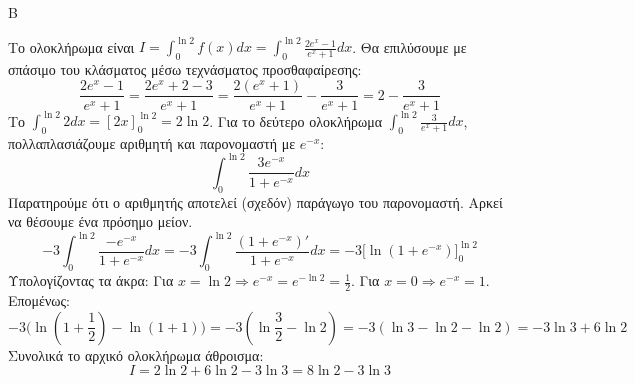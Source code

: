 \begin{thema}{Β}
\begin{erwthma}
\item Το ολοκλήρωμα είναι $I = \int_0^{\ln 2} f(x) dx = \int_0^{\ln 2} \frac{2e^x-1}{e^x+1} dx$.
Θα επιλύσουμε με σπάσιμο του κλάσματος μέσω τεχνάσματος προσθαφαίρεσης:
\[ \frac{2e^x-1}{e^x+1} = \frac{2e^x+2 - 3}{e^x+1} = \frac{2(e^x+1)}{e^x+1} - \frac{3}{e^x+1} = 2 - \frac{3}{e^x+1} \]
Το $\int_0^{\ln 2} 2 dx = [2x]_0^{\ln 2} = 2\ln 2$.
Για το δεύτερο ολοκλήρωμα $\int_0^{\ln 2} \frac{3}{e^x+1} dx$, πολλαπλασιάζουμε αριθμητή και παρονομαστή με $e^{-x}$:
\[ \int_0^{\ln 2} \frac{3e^{-x}}{1+e^{-x}} dx \]
Παρατηρούμε ότι ο αριθμητής αποτελεί (σχεδόν) παράγωγο του παρονομαστή. Αρκεί να θέσουμε ένα πρόσημο μείον.
\[ -3 \int_0^{\ln 2} \frac{-e^{-x}}{1+e^{-x}} dx = -3 \int_0^{\ln 2} \frac{(1+e^{-x})'}{1+e^{-x}} dx = -3 \Big[ \ln(1+e^{-x}) \Big]_0^{\ln 2} \]
Υπολογίζοντας τα άκρα:
Για $x = \ln 2 \Rightarrow e^{-x} = e^{-\ln 2} = \frac{1}{2}$.
Για $x = 0 \Rightarrow e^{-x} = 1$.
Επομένως:
\[ -3 \Big( \ln\left(1+\frac{1}{2}\right) - \ln(1+1) \Big) = -3 \left( \ln\frac{3}{2} - \ln 2 \right) = -3(\ln 3 - \ln 2 - \ln 2) = -3\ln 3 + 6\ln 2 \]
Συνολικά το αρχικό ολοκλήρωμα άθροισμα:
\[ I = 2\ln 2 + 6\ln 2 - 3\ln 3 = 8\ln 2 - 3\ln 3 \]
\end{erwthma}
\end{thema}
